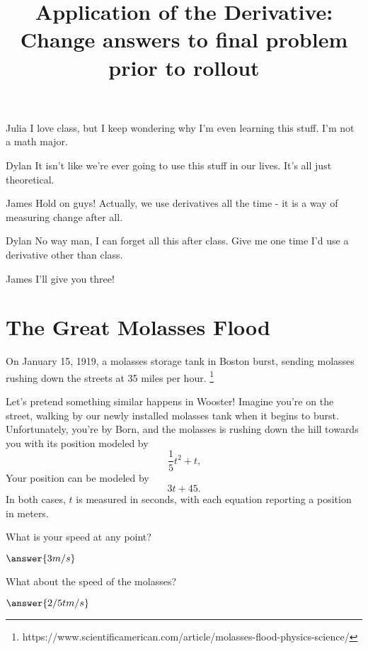\documentclass{ximera}
\title{Application of the Derivative: Change answers to final problem prior to rollout}
\begin{document}
\maketitle
\begin{dialogue}
\item[Julia] I love class, but I keep wondering why I'm even learning this stuff. I'm not a math major.
\item[Dylan] It isn't like we're ever going to use this stuff in our lives. It's all just theoretical.
\item[James] Hold on guys! Actually, we use derivatives all the time - it is a way of measuring change after all.
\item[Dylan] No way man, I can forget all this after class. Give me one time I'd use a derivative other than class.
\item[James] I'll give you three!
\end{dialogue}
\section{The Great Molasses Flood}
On January 15, 1919, a molasses storage tank in Boston burst, sending molasses rushing down the streets at 35 miles per hour. \footnote{https://www.scientificamerican.com/article/molasses-flood-physics-science/}

Let's pretend something similar happens in Wooster! Imagine you're on the street, walking by our newly installed molasses tank when it begins to burst. Unfortunately, you're by Born, and the molasses is rushing down the hill towards you with its position modeled by $$\frac{1}{5}t^2+t \text{,}$$ Your position can be modeled by $$3t+45 \text{.}$$ In both cases, $t$ is measured in seconds, with each equation reporting a position in meters.

\setcounter{problem}{0}
\begin{question}
What is your speed at any point?

$\answer{3 m/s}$

What about the speed of the molasses?

$\answer{2/5 t m/s}$
\end{question}
\end{document}
